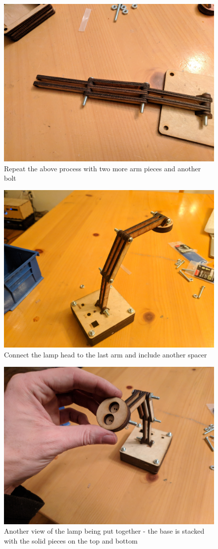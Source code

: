 \documentclass[a4paper]{article}
\begin{document}
\begin{figure}[h!]
\centerline{\includegraphics[width=.75\linewidth]{lamp6.jpg}}
\caption{Repeat the above process with two more arm pieces and another bolt}
\end{figure}

\begin{figure}[h!]
\centerline{\includegraphics[width=.75\linewidth]{lamp7.jpg}}
\caption{Connect the lamp head to the last arm and include another spacer}
\end{figure}

\begin{figure}[h!]
\centerline{\includegraphics[width=.75\linewidth]{lamp8.jpg}}
\caption{Another view of the lamp being put together - the base is stacked with the solid pieces on the top and bottom}
\end{figure}
\end{document}
